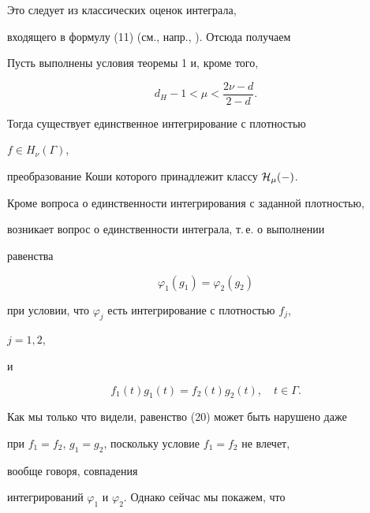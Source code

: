 Это следует из классических оценок интеграла, 


входящего в формулу (11) (см., напр., \cite{21}). Отсюда получаем 


 


\begin{cor} 


Пусть выполнены условия теоремы 1 и, кроме того, 


\begin{equation} 


d_H-1<\mu<\frac{2\nu-d}{2-d}. 


\end{equation} 


Тогда существует единственное интегрирование с плотностью 


$f\in H_\nu(\Gamma)$, 


преобразование Коши которого принадлежит классу $\cal H_\mu(\Gamma)$. 


\end{cor} 


 


Кроме вопроса о единственности интегрирования с заданной плотностью, 


возникает вопрос о единственности интеграла, т.\,е. о выполнении 


равенства 


\begin{equation} 


\varphi_1(g_1)=\varphi_2(g_2) 


\end{equation} 


при условии, что $\varphi_j$ есть интегрирование с плотностью $f_j$, 


$j=1,2$, 


и 


\begin{equation} 


f_1(t)g_1(t)=f_2(t)g_2(t),\quad t\in\Gamma. 


\end{equation} 


Как мы только что видели, равенство (20) может быть нарушено даже 


при $f_1=f_2$, $g_1=g_2$, поскольку условие $f_1=f_2$ не влечет, 


вообще говоря, совпадения 


интегрирований $\varphi_1$ и $\varphi_2$. Однако сейчас мы покажем, что 


